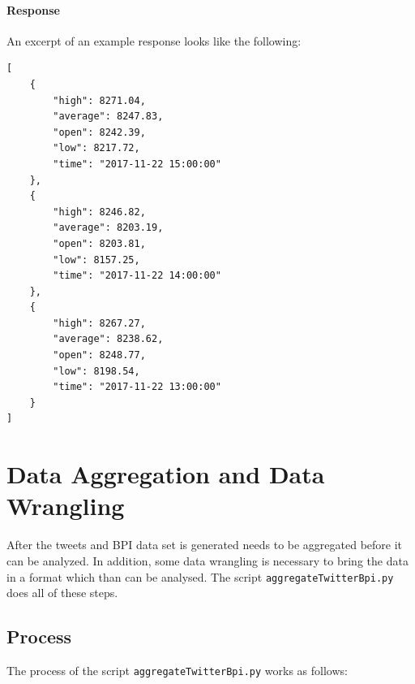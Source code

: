 \documentclass[a4paper,12pt]{article}
\begin{document}
\begin{spacing}{1.2}
\paragraph{Response}
An excerpt of an example response looks like the following:
\begin{lstlisting}
[
    {
        "high": 8271.04, 
        "average": 8247.83, 
        "open": 8242.39,
        "low": 8217.72, 
        "time": "2017-11-22 15:00:00"
    }, 
    {
        "high": 8246.82,
        "average": 8203.19,
        "open": 8203.81,
        "low": 8157.25,
        "time": "2017-11-22 14:00:00"
    }, 
    {
        "high": 8267.27, 
        "average": 8238.62, 
        "open": 8248.77, 
        "low": 8198.54, 
        "time": "2017-11-22 13:00:00"
    }
]
\end{lstlisting}

\clearpage

\section{Data Aggregation and Data Wrangling}
After the tweets and BPI data set is generated needs to be aggregated before it can be analyzed. In addition, some data wrangling is necessary to bring the data in a format which than can be analysed. The script \verb|aggregateTwitterBpi.py| does all of these steps.

\subsection{Process}
The process of the script \verb|aggregateTwitterBpi.py| works as follows:
\begin{figure}[H]
\centering
\end{figure}
\end{spacing}
\end{document}

